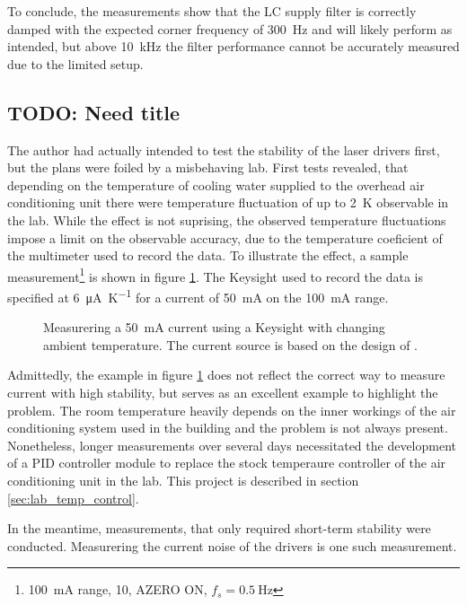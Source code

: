 To conclude, the measurements show that the LC supply filter is correctly damped with the expected corner frequency of \qty{300}{\Hz} and will likely perform as intended, but above \qty{10}{\kHz} the filter performance cannot be accurately measured due to the limited setup.


\clearpage
\subsection{TODO: Need title}
The author had actually intended to test the stability of the laser drivers first, but the plans were foiled by a misbehaving lab. First tests revealed, that depending on the temperature of cooling water supplied to the overhead air conditioning unit there were temperature fluctuation of up to \qty{2}{\K} observable in the lab. While the effect is not suprising, the observed temperature fluctuations impose a limit on the observable accuracy, due to the temperature coeficient of the multimeter used to record the data. To illustrate the effect, a sample measurement\footnote{\qty{100}{\mA} range, \qty{10}{\plc}, AZERO ON, $f_s = \qty{0.5}{\Hz}$} is shown in figure \ref{fig:laser_driver_aircon}. The Keysight  used to record the data is specified at \qty{6}{\uA \per \K} for a current of \qty{50}{\mA} on the \qty{100}{\mA} range.

\begin{figure}[ht]
    \centering
    
    \caption{Measurering a \qty{50}{\mA} current using a Keysight  with changing ambient temperature. The current source is based on the design of \citeauthor{laser_driver_digital}.}
    \label{fig:laser_driver_aircon}
\end{figure}

Admittedly, the example in figure \ref{fig:laser_driver_aircon} does not reflect the correct way to measure current with high stability, but serves as an excellent example to highlight the problem. The room temperature heavily depends on the inner workings of the air conditioning system used in the building and the problem is not always present. Nonetheless, longer measurements over several days necessitated the development of a PID controller module to replace the stock temperaure controller of the air conditioning unit in the lab. This project is described in section \ref{sec:lab_temp_control}.

In the meantime, measurements, that only required short-term stability were conducted. Measurering the current noise of the drivers is one such measurement.

